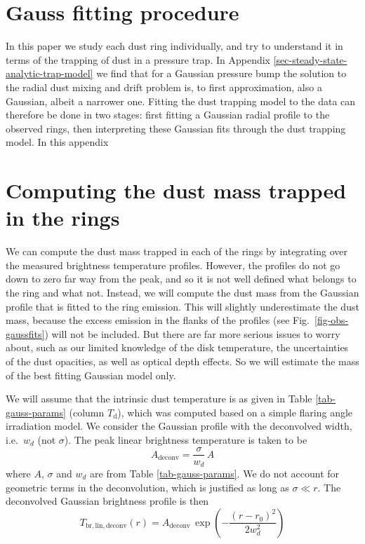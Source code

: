 \documentclass{aa}
\begin{document}
\section{Gauss fitting procedure}
\label{sec-gauss-fitting}
%
In this paper we study each dust ring individually, and try to understand it in
terms of the trapping of dust in a pressure trap. In Appendix
\ref{sec-steady-state-analytic-trap-model} we find that for a Gaussian pressure
bump the solution to the radial dust mixing and drift problem is, to first
approximation, also a Gaussian, albeit a narrower one. Fitting the dust trapping
model to the data can therefore be done in two stages: first fitting a Gaussian
radial profile to the observed rings, then interpreting these Gaussian fits
through the dust trapping model. In this appendix




\section{Computing the dust mass trapped in the rings}
\label{sec-computing-dust-mass}
%
We can compute the dust mass trapped in each of the rings by integrating over
the measured brightness temperature profiles. However, the profiles do not go
down to zero far way from the peak, and so it is not well defined what belongs
to the ring and what not. Instead, we will compute the dust mass from the
Gaussian profile that is fitted to the ring emission. This will slightly
underestimate the dust mass, because the excess emission in the flanks of the
profiles (see Fig.~\ref{fig-obs-gaussfits}) will not be included. But there are
far more serious issues to worry about, such as our limited knowledge of the
disk temperature, the uncertainties of the dust opacities, as well as optical
depth effects. So we will estimate the mass of the best fitting Gaussian model
only.

We will assume that the intrinsic dust temperature is as given in Table
\ref{tab-gauss-params} (column $T_{\mathrm{d}}$), which was computed based on
a simple flaring angle irradiation model. We consider the Gaussian profile with
the deconvolved width, i.e.\ $w_d$ (not $\sigma$). The peak linear brightness
temperature is taken to be
\begin{equation}
A_{\mathrm{deconv}} = \frac{\sigma}{w_d}\,A
\end{equation}
where $A$, $\sigma$ and $w_d$ are from Table \ref{tab-gauss-params}. We do not
account for geometric terms in the deconvolution, which is justified as long as
$\sigma\ll r$. The deconvolved Gaussian brightness profile is then
\begin{equation}\label{eq-tbrlin-deconvolved}
T_{\mathrm{br,lin,deconv}}(r) = A_{\mathrm{deconv}}\,\exp\left(-\frac{(r-r_0)^2}{2w_d^2}\right)
\end{equation}
\end{document}
